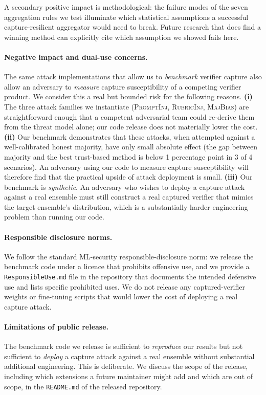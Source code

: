 \documentclass[11pt]{article}
\begin{document}
A secondary positive impact is methodological: the failure modes of
the seven aggregation rules we test illuminate which statistical
assumptions a successful capture-resilient aggregator would need
to break. Future research that does find a winning method can
explicitly cite which assumption we showed fails here.

\paragraph{Negative impact and dual-use concerns.}
The same attack implementations that allow us to \emph{benchmark}
verifier capture also allow an adversary to \emph{measure} capture
susceptibility of a competing verifier product. We consider this a
real but bounded risk for the following reasons.
\textbf{(i)} The three attack families we instantiate
(\textsc{PromptInj}, \textsc{RubricInj}, \textsc{MajBias}) are
straightforward enough that a competent adversarial team could
re-derive them from the threat model alone; our code release does
not materially lower the cost.
\textbf{(ii)} Our benchmark demonstrates that these attacks, when
attempted against a well-calibrated honest majority, have only
small absolute effect (the gap between majority and the best
trust-based method is below 1 percentage point in 3 of 4
scenarios). An adversary using our code to measure capture
susceptibility will therefore find that the practical upside of
attack deployment is small.
\textbf{(iii)} Our benchmark is \emph{synthetic}. An adversary who
wishes to deploy a capture attack against a real ensemble must
still construct a real captured verifier that mimics the target
ensemble's distribution, which is a substantially harder engineering
problem than running our code.

\paragraph{Responsible disclosure norms.}
We follow the standard ML-security responsible-disclosure norm: we
release the benchmark code under a licence that prohibits offensive
use, and we provide a \texttt{ResponsibleUse.md} file in the
repository that documents the intended defensive use and lists
specific prohibited uses. We do not release any captured-verifier
weights or fine-tuning scripts that would lower the cost of deploying
a real capture attack.

\paragraph{Limitations of public release.}
The benchmark code we release is sufficient to \emph{reproduce} our
results but not sufficient to \emph{deploy} a capture attack against
a real ensemble without substantial additional engineering. This is
deliberate. We discuss the scope of the release, including which
extensions a future maintainer might add and which are out of scope,
in the \texttt{README.md} of the released repository.
\end{document}
